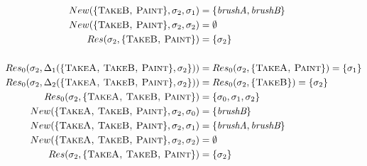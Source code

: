 \documentclass[11pt,a4paper]{article}
\begin{document}
\begin{itemize}
\begin{align*}
		New(\{ \textsc{TakeB, Paint} \}, \sigma_2, \sigma_1) &= \{ \textit{brushA}, \textit{brushB} \} \\  
 		New(\{ \textsc{TakeB, Paint} \}, \sigma_2, \sigma_2) &= \emptyset \\  
        Res(\sigma_2, \{\textsc{TakeB, Paint} \}) &= \{ \sigma_2 \} \\   
        \\ 
    	Res_0(\sigma_2, \Delta_1(\{\textsc{TakeA, TakeB, Paint} \}, \sigma_2 \})) &= Res_0(\sigma_2, \{ \textsc{TakeA, Paint} \}) = \{ \sigma_1 \} \\
    	Res_0(\sigma_2, \Delta_2(\{\textsc{TakeA, TakeB, Paint} \}, \sigma_2 \})) &= Res_0(\sigma_2, \{ \textsc{TakeB} \}) = \{ \sigma_2 \} \\
		Res_0(\sigma_2, \{\textsc{TakeA, TakeB, Paint} \}) &= \{ \sigma_0, \sigma_1, \sigma_2 \} \\  
        New(\{ \textsc{TakeA, TakeB, Paint} \}, \sigma_2, \sigma_0) &= \{ \textit{brushB}\} \\    
		New(\{ \textsc{TakeA, TakeB, Paint} \}, \sigma_2, \sigma_1) &= \{ \textit{brushA}, \textit{brushB} \} \\  
 		New(\{ \textsc{TakeA, TakeB, Paint} \}, \sigma_2, \sigma_2) &= \emptyset \\  
        Res(\sigma_2, \{\textsc{TakeA, TakeB, Paint} \}) &= \{ \sigma_2 \} \\   
        \\                   
    \end{align*}
\end{itemize}
\end{document}
